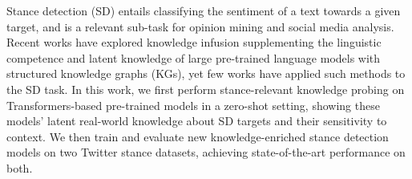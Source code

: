 Stance detection (SD) entails classifying the sentiment of a text towards a given target, and is a relevant sub-task for opinion mining and social media analysis. Recent works have explored knowledge infusion supplementing the linguistic competence and latent knowledge of large pre-trained language models with structured knowledge graphs (KGs), yet few works have applied such methods to the SD task. In this work, we first perform stance-relevant knowledge probing on Transformers-based pre-trained models in a zero-shot setting, showing these models' latent real-world knowledge about SD targets and their sensitivity to context. We then train and evaluate new knowledge-enriched stance detection models on two Twitter stance datasets, achieving state-of-the-art performance on both.
